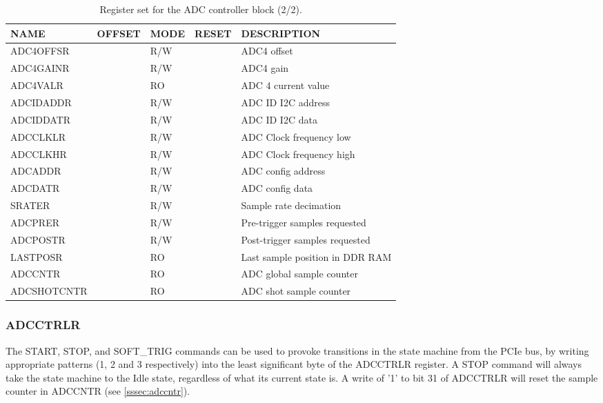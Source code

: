 \documentclass{article}
\begin{document}
\begin{table}[htbp]
  \centering
  \begin{tabularx}{\textwidth}{|l|r|l|l|X|}
    \hline
    \textbf{NAME} & \textbf{OFFSET} & \textbf{MODE} & \textbf{RESET} & \textbf{DESCRIPTION} \\
    \hline
    \hline
    ADC4OFFSR & & R/W & & ADC4 offset \\
    \hline
    ADC4GAINR & & R/W & & ADC4 gain \\
    \hline
    ADC4VALR & & RO & & ADC 4 current value \\
    \hline
    ADCIDADDR & & R/W & & ADC ID I2C address \\
    \hline
    ADCIDDATR & & R/W & & ADC ID I2C data \\
    \hline
    ADCCLKLR & & R/W & & ADC Clock frequency low \\
    \hline
    ADCCLKHR & & R/W & & ADC Clock frequency high \\
    \hline
    ADCADDR & & R/W & & ADC config address \\
    \hline
    ADCDATR & & R/W & & ADC config data \\
    \hline
    SRATER & & R/W & & Sample rate decimation \\
    \hline
    ADCPRER & & R/W & & Pre-trigger samples requested \\
    \hline
    ADCPOSTR & & R/W & & Post-trigger samples requested \\
    \hline
    LASTPOSR & & RO & & Last sample position in DDR RAM\\
    \hline
    ADCCNTR & & RO & & ADC global sample counter \\
    \hline
    ADCSHOTCNTR & & RO & & ADC shot sample counter \\
    \hline
  \end{tabularx}
  \caption{Register set for the ADC controller block (2/2).}
  \label{tab:adc_control2}
\end{table}

\subsubsection{ADCCTRLR}
The START, STOP, and SOFT\_TRIG commands can be used to provoke transitions in the state machine from the PCIe bus, by writing appropriate patterns (1, 2 and 3 respectively) into the least significant byte of the ADCCTRLR register. A STOP command will always take the state machine to the Idle state, regardless of what its current state is. A write of '1' to bit 31 of ADCCTRLR will reset the sample counter in ADCCNTR (see \ref{sssec:adccntr}).
\end{document}
